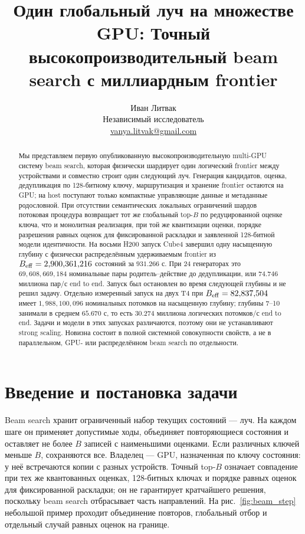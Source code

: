 \documentclass[10pt,twocolumn]{article}
\title{Один глобальный луч на множестве GPU: Точный высокопроизводительный beam search с миллиардным frontier}
\author{Иван Литвак\\Независимый исследователь\\\href{mailto:vanya.litvak@gmail.com}{vanya.litvak@gmail.com}}
\date{}
\begin{document}
\raggedbottom
{}
\maketitle

\begin{abstract}
Мы представляем первую опубликованную высокопроизводительную multi-GPU систему
beam search, которая физически шардирует один логический frontier между
устройствами и совместно строит один следующий луч. Генерация кандидатов,
оценка, дедупликация по 128-битному ключу, маршрутизация и хранение frontier
остаются на GPU; на host поступают только компактные управляющие данные и
метаданные родословной. При отсутствии семантических локальных ограничений
шардов потоковая процедура возвращает тот же глобальный top-$B$ по
редуцированной оценке ключа, что и монолитная реализация, при той же квантизации
оценки, порядке разрешения равных оценок для фиксированной раскладки и
заявленной 128-битной модели идентичности. На восьми H200 запуск Cube4
завершил одну насыщенную глубину с физически распределённым удерживаемым
frontier из $B_{\rm eff}=2{,}900{,}361{,}216$ состояний за $931.266$ с.
При 24 генераторах это $69{,}608{,}669{,}184$ номинальные пары
родитель--действие до дедупликации, или $74.746$ миллиона пар/с end to end.
Запуск был остановлен во время следующей глубины и не решил задачу. Отдельно
измеренный запуск на двух T4 при $B_{\rm eff}=82{,}837{,}504$ имеет
$1{,}988{,}100{,}096$ номинальных потомков на насыщенную глубину; глубины
7--10 занимали в среднем $65.670$ с, то есть $30.274$ миллиона логических
потомков/с end to end. Задачи и модели в этих запусках различаются, поэтому
они не устанавливают strong scaling. Новизна состоит в
полной системной совокупности свойств, а не в параллельном, GPU- или
распределённом beam search по отдельности.
\end{abstract}

\section{Введение и постановка задачи}
Beam search хранит ограниченный набор текущих состояний --- луч. На каждом
шаге он применяет допустимые ходы, объединяет повторяющиеся состояния и
оставляет не более $B$ записей с наименьшими оценками. Если различных ключей
меньше $B$, сохраняются все. Владелец --- GPU, назначенная по ключу состояния:
у неё встречаются копии с разных устройств. Точный top-$B$ означает совпадение
при тех же квантованных оценках, 128-битных ключах и порядке равных оценок для
фиксированной раскладки; он не гарантирует кратчайшего решения, поскольку
beam search отбрасывает часть направлений.
На рис.~\ref{fig:beam_step} небольшой пример проходит объединение повторов,
глобальный отбор и отдельный случай равных оценок на границе.
\end{document}

